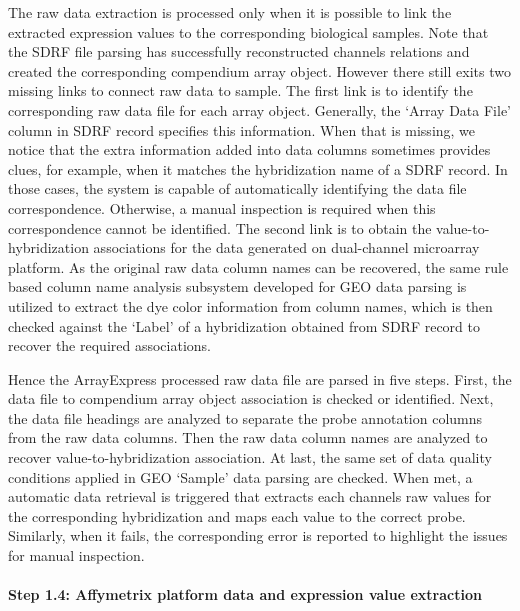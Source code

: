 The raw data extraction is processed only when it is possible to link the extracted expression values to the corresponding biological samples. Note that the SDRF file parsing has successfully reconstructed channels relations and created the corresponding compendium array object. However there still exits two missing links to connect raw data to sample. The first link is to identify the corresponding raw data file for each array object.  Generally, the `Array Data File' column in SDRF record specifies this information. When that is missing, we notice that the extra information added into data columns sometimes provides clues, for example, when it matches the hybridization name of a SDRF record. In those cases, the system is capable of automatically identifying the data file correspondence. Otherwise, a manual inspection is required when this correspondence cannot be identified. The second link is to obtain the value-to-hybridization associations for the data generated on dual-channel microarray platform. As the original raw data column names can be recovered, the same rule based column name analysis subsystem developed for GEO data parsing is utilized to extract the dye color information from column names, which is then checked against the `Label' of a hybridization obtained from SDRF record to recover the required associations.

Hence the ArrayExpress processed raw data file are parsed in five steps. First, the data file to compendium array object association is checked or identified.  Next, the data file headings are analyzed to separate the probe annotation columns from the raw data columns.  Then the raw data column names are analyzed to recover value-to-hybridization association.  At last, the same set of data quality conditions applied in GEO `Sample' data parsing are checked.  When met, a automatic data retrieval is triggered that extracts each channels raw values for the corresponding hybridization and maps each value to the correct probe. Similarly, when it fails, the corresponding error is reported to highlight the issues for manual inspection.
















\paragraph{Step 1.4: Affymetrix platform data and expression value extraction}\label{sec:command-affy}


